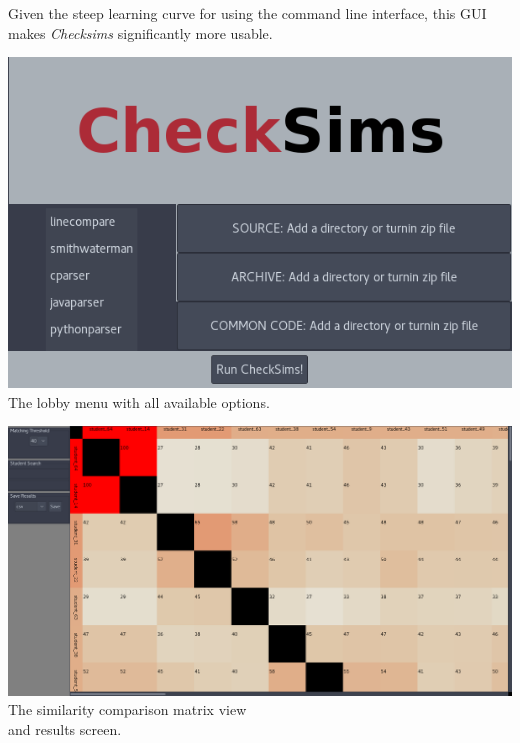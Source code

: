 \documentclass[landscape,a0paper,fontscale=0.285]{baposter}
\begin{document}
\begin{poster}
{    Given the steep learning curve for using the command line interface, this GUI
    makes \textit{Checksims} significantly more usable.

    \parbox[c][0.35\linewidth][b]{0.48\linewidth}{
      \includegraphics[width=0.9\linewidth]{initial_run.png} \\
      The lobby menu with all available options.
    }
    \parbox[c][0.35\linewidth][b]{0.48\linewidth}{
      \includegraphics[width=0.9\linewidth]{demo_screen.png} \\
      The similarity comparison matrix view \\
      and results screen.
    }
}


\end{poster}
\end{document}
